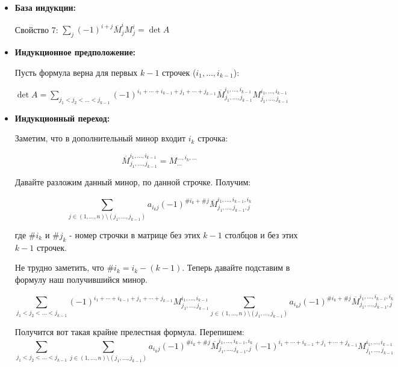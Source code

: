 \documentclass[twoside]{book}
\begin{document}
\begin{itemize}
    \item \textbf{База индукции:}

          Свойство 7: \(\sum\limits_{j}(-1)^{i+j}\overline{M}_j^i M_j^i = \det A\)

    \item \textbf{Индукционное предположение:}

          Пусть формула верна для первых \(k-1\) строчек ($i_1,\ldots, i_{k-1}$):


          \(\det A = \sum\limits_{j_1<j_2<\ldots<j_{k-1}} (-1)^{i_1 + \cdots + i_{k-1}+j_1 + \cdots + j_{k-1}} \overline{M}_{j_1,\ldots, j_{k-1}}^{i_1,\ldots,i_{k-1}}M_{j_1,\ldots, j_{k-1}}^{i_1,\ldots,i_{k-1}}\)


    \item \textbf{Индукционный переход:}

          Заметим, что в дополнительный минор входит $i_k$ строчка:

          \[\overline{M}_{j_1, \ldots, j_{k - 1}}^{i_1, \ldots, i_{k - 1}} = M_{\ldots}^{\ldots, i_k, \ldots}\]

          Давайте разложим данный минор, по данной строчке. Получим:


          \[\sum\limits_{j \in (1, \ldots, n) \setminus (j_1, \ldots, j_{k-1})} a_{i_k j} (-1)^{\# i_k + \# j} \overline{M}_{j_1, \ldots, j_{k - 1},j}^{i_1, \ldots, i_{k - 1}, i_k}\]

          где $\#i_k$ и $\# j_k$ - номер строчки в матрице без этих $k-1$ столбцов и без этих $k-1$ строчек.


          Не трудно заметить, что \(\# i_k = i_k - (k - 1)\). Теперь давайте подставим в формулу наш получившийся минор.


          \small\[\sum\limits_{j_1<j_2<\ldots<j_{k-1}} (-1)^{i_1 + \cdots + i_{k-1}+j_1 + \cdots + j_{k-1}} M_{j_1,\ldots, j_{k-1}}^{i_1,\ldots,i_{k-1}} \sum\limits_{j \in (1, \ldots, n) \setminus (j_1, \ldots, j_{k-1})} a_{i_k j} (-1)^{\# i_k + \# j} \overline{M}_{j_1, \ldots, j_{k - 1},j}^{i_1, \ldots, i_{k - 1}, i_k}\]\normalsize

          Получится вот такая крайне прелестная формула. Перепишем:
          \small\[\sum\limits_{j_1<j_2<\ldots<j_{k-1}}  \sum\limits_{j \in (1, \ldots, n) \setminus (j_1, \ldots, j_{k-1})} a_{i_k j} (-1)^{\# i_k + \# j} \overline{M}_{j_1, \ldots, j_{k - 1},j}^{i_1, \ldots, i_{k - 1}, i_k} (-1)^{i_1 + \cdots + i_{k-1}+j_1 + \cdots + j_{k-1}} M_{j_1,\ldots, j_{k-1}}^{i_1,\ldots,i_{k-1}}\]\normalsize



\end{itemize}
\end{document}
